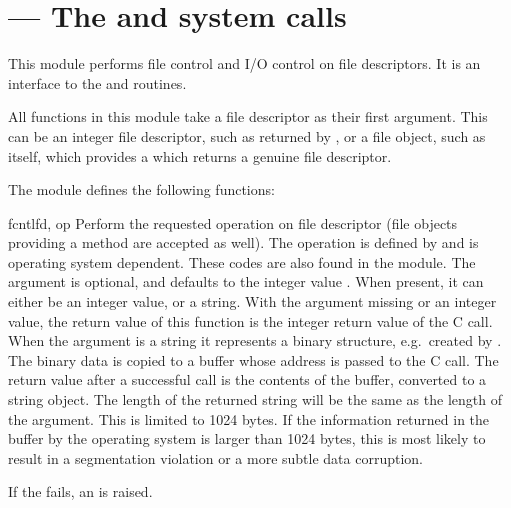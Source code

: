 \section{ ---
         The  and  system calls}



This module performs file control and I/O control on file descriptors.
It is an interface to the  and 
\UNIX{} routines.

All functions in this module take a file descriptor  as their
first argument.  This can be an integer file descriptor, such as
returned by , or a file object, such as
 itself, which provides a  which
returns a genuine file descriptor.

The module defines the following functions:


\begin{funcdesc}{fcntl}{fd, op}
  Perform the requested operation on file descriptor  (file
  objects providing a  method are accepted as well).
  The operation is defined by  and is operating system
  dependent.  These codes are also found in the 
  module. The argument  is optional, and defaults to the
  integer value .  When present, it can either be an integer
  value, or a string.  With the argument missing or an integer value,
  the return value of this function is the integer return value of the
  C  call.  When the argument is a string it
  represents a binary structure, e.g.\ created by
  . The binary data is copied to a buffer
  whose address is passed to the C  call.  The
  return value after a successful call is the contents of the buffer,
  converted to a string object.  The length of the returned string
  will be the same as the length of the  argument.  This is
  limited to 1024 bytes.  If the information returned in the buffer by
  the operating system is larger than 1024 bytes, this is most likely
  to result in a segmentation violation or a more subtle data
  corruption.

  If the  fails, an  is
  raised.
\end{funcdesc}

